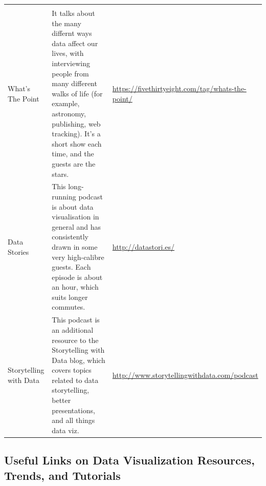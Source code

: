 \documentclass[]{book}
\begin{document}
\begin{longtable}[]{@{}lll@{}}
\begin{minipage}[t]{0.11\columnwidth}
\end{minipage}\tabularnewline
\begin{minipage}[t]{0.11\columnwidth}\raggedright
What's The Point\strut
\end{minipage} & \begin{minipage}[t]{0.68\columnwidth}\raggedright
It talks about the many differnt ways data affect our lives, with interviewing people from many different walks of life (for example, astronomy, publishing, web tracking). It's a short show each time, and the guests are the stars.\strut
\end{minipage} & \begin{minipage}[t]{0.11\columnwidth}\raggedright
\url{https://fivethirtyeight.com/tag/whats-the-point/}\strut
\end{minipage}\tabularnewline
\begin{minipage}[t]{0.11\columnwidth}\raggedright
Data Stories\strut
\end{minipage} & \begin{minipage}[t]{0.68\columnwidth}\raggedright
This long-running podcast is about data visualisation in general and has consistently drawn in some very high-calibre guests. Each episode is about an hour, which suits longer commutes.\strut
\end{minipage} & \begin{minipage}[t]{0.11\columnwidth}\raggedright
\url{http://datastori.es/}\strut
\end{minipage}\tabularnewline
\begin{minipage}[t]{0.11\columnwidth}\raggedright
Storytelling with Data\strut
\end{minipage} & \begin{minipage}[t]{0.68\columnwidth}\raggedright
This podcast is an additional resource to the Storytelling with Data blog, which covers topics related to data storytelling, better presentations, and all things data viz.\strut
\end{minipage} & \begin{minipage}[t]{0.11\columnwidth}\raggedright
\url{http://www.storytellingwithdata.com/podcast}\strut
\end{minipage}\tabularnewline
\bottomrule
\end{longtable}

\hypertarget{useful-links-on-data-visualization-resources-trends-and-tutorials}{%
\subsection{Useful Links on Data Visualization Resources, Trends, and Tutorials}\label{useful-links-on-data-visualization-resources-trends-and-tutorials}}
\end{document}
